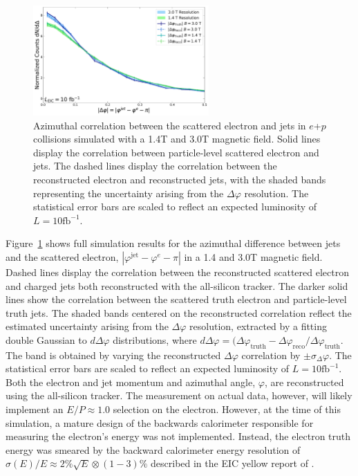 \begin{figure}[htbp]
    \centering
\includegraphics[height=0.4\textwidth,width=0.6\textwidth]{EIC_Jets/azimuthal_correlations.pdf}
    \caption{Azimuthal correlation between the scattered electron and jets in $e$+$p$ collisions simulated with a 1.4T and 3.0T magnetic field. Solid lines display the correlation between particle-level scattered electron and jets. The dashed lines display the correlation between the reconstructed electron and reconstructed jets, with the shaded bands representing the uncertainty arising from the $\Delta\varphi$ resolution. The statistical error bars are scaled to reflect an expected luminosity of $L = 10\mathrm{fb}^{-1}$.}
    \label{fig:az_corr}
\end{figure}

Figure~\ref{fig:az_corr} shows full simulation results for the azimuthal difference between jets and the scattered electron, $|\varphi^\mathrm{jet} - \varphi^{e} - \pi|$ in a 1.4 and 3.0T magnetic field. Dashed lines display the correlation between the reconstructed scattered electron and charged jets both reconstructed with the all-silicon tracker. The darker solid lines show the correlation between the scattered truth electron and particle-level truth jets. The shaded bands centered on the reconstructed correlation reflect the estimated uncertainty arising from the $\Delta\varphi$ resolution, extracted by a fitting double Gaussian to $d\Delta\varphi$ distributions, where $d\Delta\varphi = (\Delta\varphi_\mathrm{truth}-\Delta\varphi_\mathrm{reco}/\Delta\varphi_\mathrm{truth}$. The band is obtained by varying the reconstructed $\Delta\varphi$ correlation by $\pm \sigma_\Delta\varphi$. The statistical error bars are scaled to reflect an expected luminosity of $L = 10\mathrm{fb}^{-1}$. Both the electron and jet momentum and azimuthal angle, $\varphi$, are reconstructed using the all-silicon tracker. The measurement on actual data, however, will likely implement an $E/P \approx 1.0$ selection on the electron. However, at the time of this simulation, a mature design of the backwards calorimeter responsible for measuring the electron's energy was not implemented. Instead, the electron truth energy was smeared by the backward calorimeter energy resolution of $\sigma(E)/E\approx 2\%\sqrt{E}\otimes (1-3)\%$ described in the EIC yellow report of \cite{Khalek2021}.

